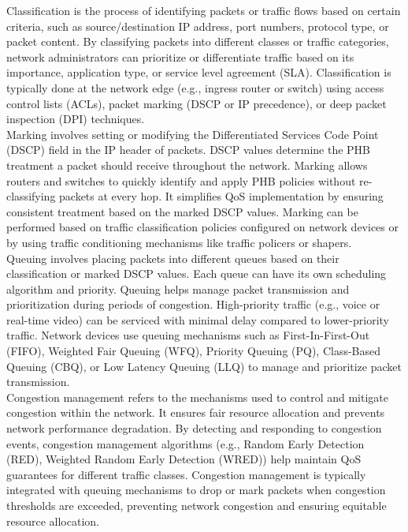 \documentclass{article}
\begin{document}
	Classification is the process of identifying packets or traffic flows based on certain criteria, such as source/destination IP address, port numbers, protocol type, or packet content. By classifying packets into different classes or traffic categories, network administrators can prioritize or differentiate traffic based on its importance, application type, or service level agreement (SLA). Classification is typically done at the network edge (e.g., ingress router or switch) using access control lists (ACLs), packet marking (DSCP or IP precedence), or deep packet inspection (DPI) techniques.\\
	
	Marking involves setting or modifying the Differentiated Services Code Point (DSCP) field in the IP header of packets. DSCP values determine the PHB treatment a packet should receive throughout the network. Marking allows routers and switches to quickly identify and apply PHB policies without re-classifying packets at every hop. It simplifies QoS implementation by ensuring consistent treatment based on the marked DSCP values. Marking can be performed based on traffic classification policies configured on network devices or by using traffic conditioning mechanisms like traffic policers or shapers.\\
	
	Queuing involves placing packets into different queues based on their classification or marked DSCP values. Each queue can have its own scheduling algorithm and priority. Queuing helps manage packet transmission and prioritization during periods of congestion. High-priority traffic (e.g., voice or real-time video) can be serviced with minimal delay compared to lower-priority traffic. Network devices use queuing mechanisms such as First-In-First-Out (FIFO), Weighted Fair Queuing (WFQ), Priority Queuing (PQ), Class-Based Queuing (CBQ), or Low Latency Queuing (LLQ) to manage and prioritize packet transmission.\\
	
	Congestion management refers to the mechanisms used to control and mitigate congestion within the network. It ensures fair resource allocation and prevents network performance degradation. By detecting and responding to congestion events, congestion management algorithms (e.g., Random Early Detection (RED), Weighted Random Early Detection (WRED)) help maintain QoS guarantees for different traffic classes. Congestion management is typically integrated with queuing mechanisms to drop or mark packets when congestion thresholds are exceeded, preventing network congestion and ensuring equitable resource allocation.\\
	
\end{document}
